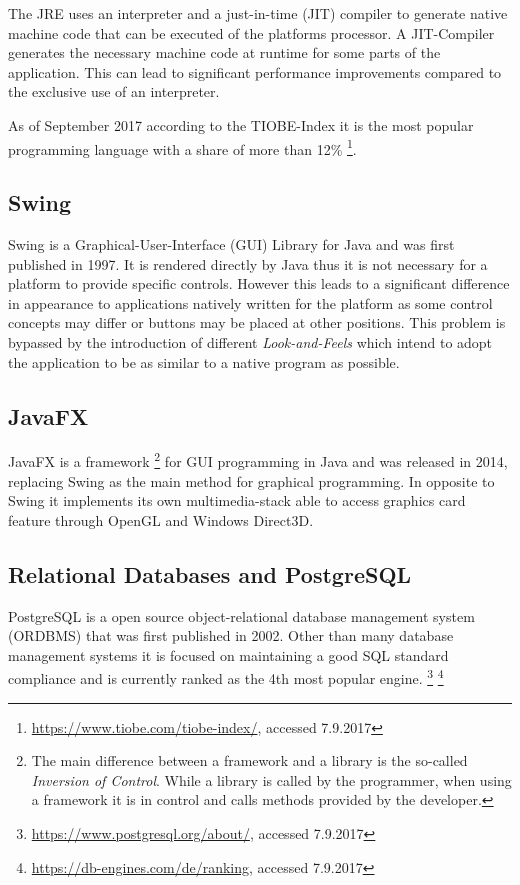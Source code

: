 The JRE uses an interpreter and a just-in-time (JIT) compiler to generate native machine code that can be executed of the platforms processor. A JIT-Compiler generates the necessary machine code at runtime for some parts of the application. This can lead to significant performance improvements compared to the exclusive use of an interpreter.

As of September 2017 according to the TIOBE-Index it is the most popular programming language with a share of more than 12\% \footnote{\href{https://www.tiobe.com/tiobe-index/}{https://www.tiobe.com/tiobe-index/}, accessed 7.9.2017}. 
\subsection{Swing}
\label{sec:swing}
Swing is a Graphical-User-Interface (GUI) Library for Java and was first published in 1997. It is rendered directly by Java thus it is not necessary for a platform to provide specific controls. However this leads to a significant difference in appearance to applications natively written for the platform as some control concepts may differ or buttons may be placed at other positions. This problem is bypassed by the introduction of different \emph{Look-and-Feels} which intend to adopt the application to be as similar to a native program as possible.

\subsection{JavaFX}
\label{sec:javafx}
JavaFX is a framework \footnote{The main difference between a framework and a library is the so-called \emph{Inversion of Control}. While a library is called by the programmer, when using a framework it is in control and calls methods provided by the developer.} for GUI programming in Java and was released in 2014, replacing Swing as the main method for graphical programming. In opposite to Swing it implements its own multimedia-stack able to access graphics card feature through OpenGL and Windows Direct3D.  

\subsection{Relational Databases and PostgreSQL}
\label{sec:postgres}
PostgreSQL is a open source object-relational database management system (ORDBMS) that was first published in 2002. Other than many database management systems it is focused on maintaining a good SQL standard compliance and is currently ranked as the 4th most popular engine. \footnote{ \href{https://www.postgresql.org/about/}{https://www.postgresql.org/about/}, accessed 7.9.2017} \footnote{\href{https://db-engines.com/de/ranking}{https://db-engines.com/de/ranking}, accessed 7.9.2017}


